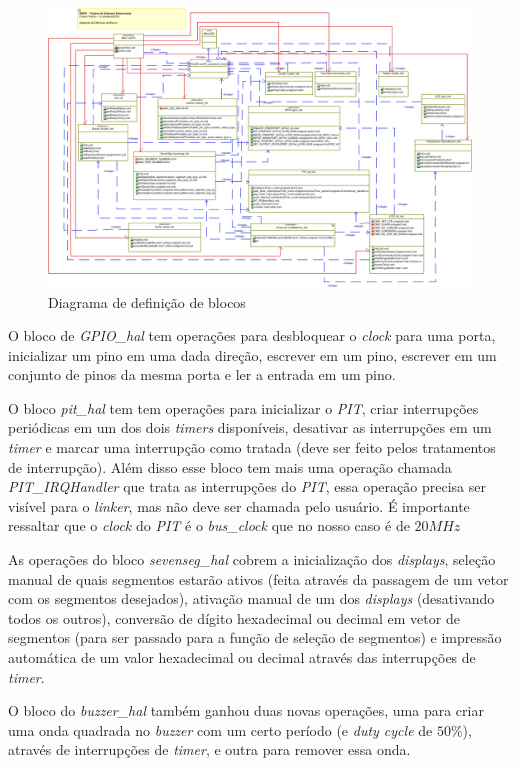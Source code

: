 \documentclass{article}
\begin{document}
\begin{figure}[H]
	\centering
	\includegraphics[width=1.5\linewidth, center]{blocos}
	\caption{Diagrama de definição de blocos}
	\label{fig:blocos}
\end{figure}

O bloco de \textit{GPIO\_hal} tem operações para desbloquear o \textit{clock} para uma porta, inicializar um pino em uma dada direção, escrever em um pino, escrever em um conjunto de pinos da mesma porta e ler a entrada em um pino.

O bloco \textit{pit\_hal} tem tem operações para inicializar o \textit{PIT}, criar interrupções periódicas em um dos dois \textit{timers} disponíveis, desativar as interrupções em um \textit{timer} e marcar uma interrupção como tratada (deve ser feito pelos tratamentos de interrupção). Além disso esse bloco tem mais uma operação chamada \textit{PIT\_IRQHandler }que trata as interrupções do \textit{PIT}, essa operação precisa ser visível para o \textit{linker}, mas não deve ser chamada pelo usuário. É importante ressaltar que o \textit{clock} do \textit{PIT} é o \textit{bus\_clock} que no nosso caso é de $20MHz$

As operações do bloco \textit{sevenseg\_hal} cobrem a inicialização dos \textit{displays}, seleção manual de quais segmentos estarão ativos (feita através da passagem de um vetor com os segmentos desejados), ativação manual de um dos \textit{displays} (desativando todos os outros), conversão de dígito hexadecimal ou decimal em vetor de segmentos (para ser passado para a função de seleção de segmentos) e impressão automática de um valor hexadecimal ou decimal através das interrupções de \textit{timer}.

O bloco do \textit{buzzer\_hal} também ganhou duas novas operações, uma para criar uma onda quadrada no \textit{buzzer} com um certo período (e \textit{duty cycle} de $50\%$), através de interrupções de \textit{timer}, e outra para remover essa onda.
\end{document}
